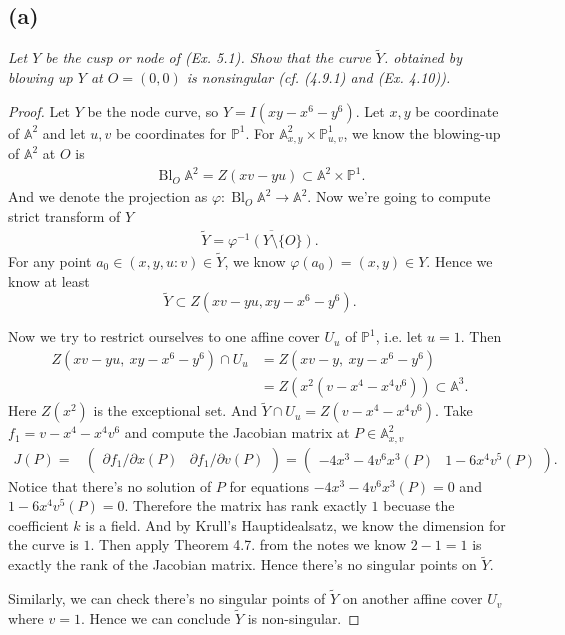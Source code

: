 \subsection{(a)}
\textit{Let $Y$ be the cusp or node of (Ex. 5.1). Show that the curve $\widetilde{Y}$. obtained by
blowing up $Y$ at $O = (0,0)$ is nonsingular (cf. (4.9.1) and (Ex. 4.10)).}

\begin{proof}
    Let $Y$ be the node curve, so $Y=I(xy-x^6-y^6)$. Let $x,y$ be coordinate of $\mathbb A^2$ and let $u,v$ be coordinates for $\mathbb P^1$. For $\mathbb A^2_{x,y}\times \mathbb P^1_{u,v}$, we know the blowing-up of $\mathbb A^2$ at $O$ is 
    \begin{align*}
        \operatorname{Bl}_{O}\mathbb A^2=Z(xv-yu)\subset \mathbb A^2\times \mathbb P^1.
    \end{align*}
    And we denote the projection as $\varphi:\operatorname{Bl}_{O}\mathbb A^2\to \mathbb A^2$.
    Now we're going to compute strict transform of $Y$ 
    \begin{align*}
        \widetilde{Y}=\overline{\varphi^{-1}(Y\setminus \{O\})}.
    \end{align*}
    For any point $a_0\in (x,y,u:v)\in \widetilde Y$, we know $\varphi (a_0)=(x,y)\in Y$. Hence we know at least 
    \[\widetilde Y\subset Z(xv-yu,xy-x^6-y^6).\]

    Now we try to restrict ourselves to one affine cover $U_u$ of $\mathbb P^1$, i.e. let $u=1$. Then 
    \begin{align*}
        Z(xv-yu,~xy-x^6-y^6)\cap U_u &=Z(xv-y,~ xy-x^6-y^6)\\
        &=Z(x^2(v-x^4-x^4v^6))\subset \mathbb A^3.
    \end{align*}
    Here $Z(x^2)$ is the exceptional set. And $\widetilde{Y}\cap U_u=Z(v-x^4-x^4v^6)$. Take $f_1=v-x^4-x^4v^6$ and compute the Jacobian matrix at $P\in \mathbb A^2_{x,v}$
    \begin{align*}
        J(P) =& \begin{pmatrix}
                \partial f_1/\partial x (P) & \partial f_1/\partial v (P)
                \end{pmatrix}
            = \begin{pmatrix}
                -4x^3-4v^6x^3 (P) & 1-6x^4v^5 (P)
            \end{pmatrix}.
    \end{align*}
    Notice that there's no solution of $P$ for equations $-4x^3-4v^6x^3(P)=0$ and $1-6x^4v^5 (P)=0$. Therefore the matrix has rank exactly $1$ becuase the coefficient $k$ is a field. And by Krull's Hauptidealsatz, we know the dimension for the curve is $1$. Then apply Theorem 4.7. from the notes we know $2-1=1$ is exactly the rank of the Jacobian matrix. Hence there's no singular points on $\widetilde{Y}$.

    Similarly, we can check there's no singular points of $\widetilde{Y}$ on another affine cover $U_v$ where $v=1$. Hence we can conclude $\widetilde{Y}$ is non-singular.
\end{proof}

